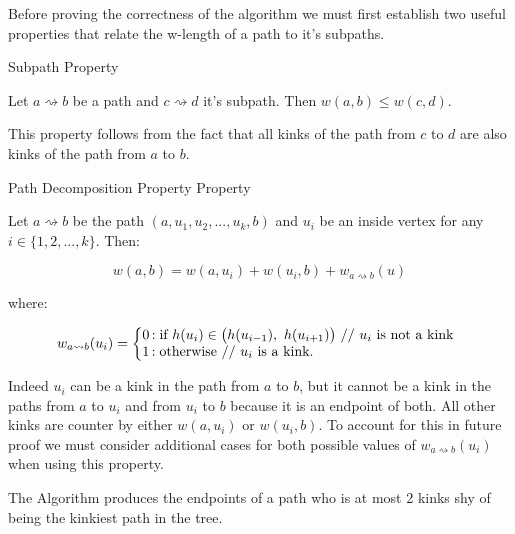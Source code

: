 Before proving the correctness of the algorithm we must first establish two useful properties that relate the w-length of a path to it's subpaths.

\begin{defn} Subpath Property  \end{defn}

Let $a \rightsquigarrow b$ be a path and $c \rightsquigarrow d$ it's subpath. Then $w(a, b) \le w(c, d)$. 

This property follows from the fact that all kinks of the path from $c$ to $d$ are also kinks of the path from $a$ to $b$.

\begin{defn} Path Decomposition Property Property  \end{defn}

    Let $a \rightsquigarrow b$ be the path $(a, u_1, u_2, ..., u_k, b)$ and $u_i$ be an inside vertex for any $i \in \{1, 2, ..., k\}$. Then: 
    
    $$w(a, b) = w(a, u_i) + w(u_i, b) + w_{a \rightsquigarrow b}(u)$$
    
   where:
    
   $$
   w_{a \rightsquigarrow b}(u_i) = \left\{
       \begin{array}{@{}l@{\thinspace}l}
           \text{0}  &: \text{if } h(u_i) \in \big(h(u_{i-1}),~h(u_{i+1}) \big) \text{ // $u_i$ is not a kink} \\
           \text{1} &: \text{otherwise // $u_i$ is a kink.} \\
       \end{array}
   \right.
   $$

   Indeed $u_i$ can be a kink in the path from $a$ to $b$, but it cannot be a kink in the paths from $a$ to $u_i$ and from $u_i$ to $b$ because it is an endpoint of both. All other kinks are counter by either $w(a, u_i)$ or $w(u_i, b)$. To account for this in future proof we must consider additional cases for both possible values of $w_{a\rightsquigarrow b}(u_i)$ when using this property.



\begin{lem} The Algorithm produces the endpoints of a path who is at most 2 kinks shy of being the kinkiest path in the tree. \end{lem}


